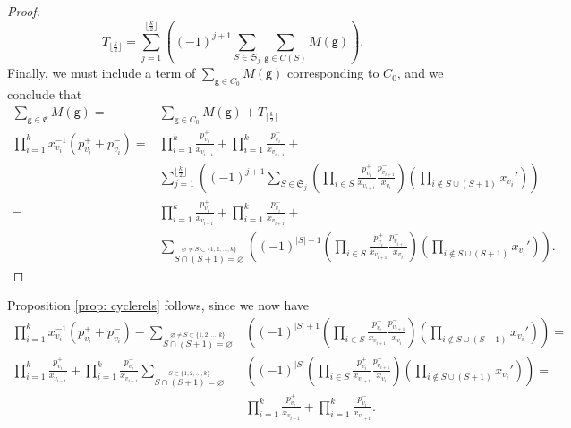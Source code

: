 \documentclass[10pt]{amsart}
\numberwithin{equation}{section}
\theoremstyle{definition}
\newtheorem{defn}[thm]{Definition}
\theoremstyle{remark}
\newcommand{\C}{\mathbb{C}}
\renewcommand{\phi}{\varphi}
\renewcommand{\emptyset}{\varnothing}
\newcommand{\1}{^{-1}}
\begin{document}
\begin{proof}
\[
T_{\lfloor \frac k2 \rfloor} = \sum_{j=1}^{\lfloor \frac k2 \rfloor}\left((-1)^{j+1} \sum_{S \in \mathfrak S_j} \sum_{\mathsf g \in C(S)} M(\mathsf g)\right).
\]
Finally, we must include a term of $\sum_{\mathsf g \in C_0} M(\mathsf g)$ corresponding to $C_0$, and we conclude that
\begin{align*}
\sum_{\mathsf g \in \mathfrak C} M(\mathsf g) =&\sum_{\mathsf g \in C_0} M(\mathsf g) + T_{\lfloor \frac k2 \rfloor}\\
\prod_{i=1}^k x_{v_i}\1 (p_{v_i}^+ + p_{v_i}^-) =& \prod_{i=1}^k \frac{p_{v_i}^+}{x_{v_{i-1}}} + \prod_{i=1}^k \frac{p_{v_i}^-}{x_{v_{i+1}}} +\\
&\sum_{j=1}^{\lfloor \frac k2 \rfloor}\left((-1)^{j+1} \sum_{S \in \mathfrak S_j} \left(\prod_{i\in S} \frac{p_{v_i}^+}{x_{v_{i+1}}}\frac{p_{v_{i+1}}^-}{x_{v_i}}\right) \left(\prod_{i \notin S \cup (S+1)} \!\!\!x_{v_i}'\right)\right) \\
=& \prod_{i=1}^k \frac{p_{v_i}^+}{x_{v_{i-1}}} +\prod_{i=1}^k \frac{p_{v_i}^-}{x_{v_{i+1}}} + \\
&\sum_{\stackrel{\emptyset \neq S\subset \{1,2,\dots,k\}}{S\cap (S+1)=\emptyset}} \left((-1)^{|S|+1} \left(\prod_{i\in S} \frac{p_{v_i}^+}{x_{v_{i+1}}}\frac{p_{v_{i+1}}^-}{x_{v_i}}\right) \left(\prod_{i \notin S \cup (S+1)} \!\!\!x_{v_i}'\right)\right).
\end{align*}
\end{proof}
Proposition \ref{prop: cyclerels} follows, since we now have
\begin{align*}
\prod_{i=1}^k x_{v_i}\1 (p_{v_i}^+ + p_{v_i}^-) - \sum_{\stackrel{\emptyset \neq S\subset \{1,2,\dots,k\}}{S\cap (S+1)=\emptyset}} &\left((-1)^{|S|+1} \left(\prod_{i\in S} \frac{p_{v_i}^+}{x_{v_{i+1}}}\frac{p_{v_{i+1}}^-}{x_{v_i}}\right) \left(\prod_{i \notin S \cup (S+1)} \!\!\!x_{v_i}'\right)\right)=\\
	 \prod_{i=1}^k \frac{p_{v_i}^+}{x_{v_{i-1}}} + \prod_{i=1}^k \frac{p_{v_i}^-}{x_{v_{i+1}}}
\sum_{\stackrel{S\subset \{1,2,\dots,k\}}{S\cap (S+1)=\emptyset}} &\left((-1)^{|S|} \left(\prod_{i\in S} \frac{p_{v_i}^+}{x_{v_{i+1}}}\frac{p_{v_{i+1}}^-}{x_{v_i}}\right) \left(\prod_{i \notin S \cup (S+1)} \!\!\!x_{v_i}'\right)\right) =\\
& \prod_{i=1}^k\frac{p_{v_i}^+}{x_{v_{i-1}}}+ \prod_{i=1}^k\frac{p_{v_i}^-}{x_{v_{i+1}}}.
\end{align*}

\end{document}
